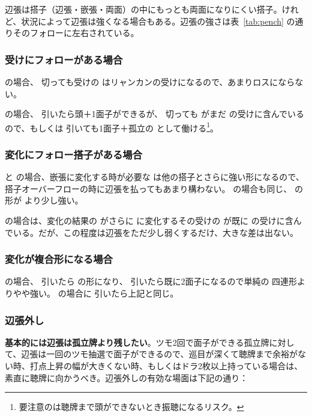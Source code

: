 \documentclass[../nankiru_main.tex]{subfiles}
\begin{document}
辺張は搭子（辺張・嵌張・両面）の中にもっとも両面になりにくい搭子。けれど、状況によって辺張は強くなる場合もある。辺張の強さは表~\ref{tab:pench} の通りそのフォローに左右されている\citep{gendai-penchan}。


\subsubsection*{受けにフォローがある場合}

 の場合、 切っても受けの  はリャンカンの受けになるので、あまりロスにならない\citep{gendai-penchan}。

 の場合、 引いたら頭＋1面子ができるが、 切っても  がまだ  の受けに含んでいるので、もしくは  引いても1面子＋孤立の  として働ける\footnote{要注意のは聴牌まで頭ができないとき振聴になるリスク。}\citep{gendai-penchan}。


\subsubsection*{変化にフォロー搭子がある場合}

 と  の場合、嵌張に変化する時が必要な  は他の搭子とさらに強い形になるので、搭子オーバーフローの時に辺張を払ってもあまり構わない。 の場合も同じ、 の形が  より少し強い\citep{gendai-penchan}。

 の場合は、変化の結果の  がさらに  に変化するその受けの  が既に  の受けに含んでいる。だが、この程度は辺張をただ少し弱くするだけ、大きな差は出ない\citep{gendai-penchan}。


\subsubsection*{変化が複合形になる場合}

 の場合、 引いたら  の形になり、 引いたら既に2面子になるので単純の  四連形よりやや強い。 の場合に  引いたら上記と同じ\citep{gendai-penchan}。


\subsubsection*{辺張外し}

\textbf{基本的には辺張は孤立牌より残したい}。ツモ2回で面子ができる孤立牌に対して、辺張は一回のツモ抽選で面子ができるので、巡目が深くて聴牌まで余裕がない時、打点上昇の幅が大きくない時、もしくはドラ2枚以上持っている場合は、素直に聴牌に向かうべき\citep[][pp. 48--55]{tetsusenryaku}。辺張外しの有効な場面は下記の通り：
\end{document}
